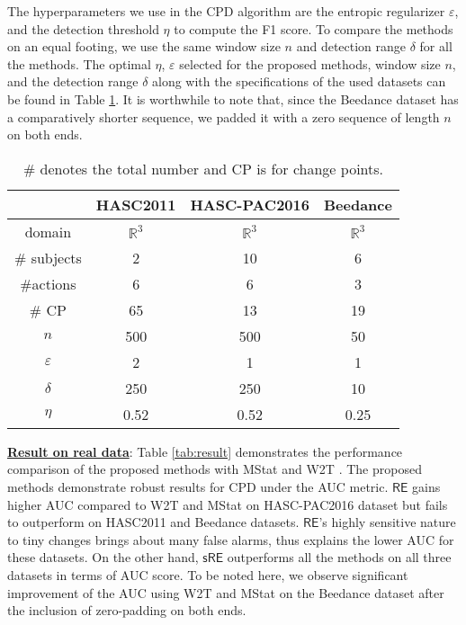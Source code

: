 \documentclass{article}
\begin{document}
The hyperparameters we use in the CPD algorithm are the entropic regularizer $\varepsilon$, and the detection threshold $\eta$ to compute the F1 score. To compare the methods on an equal footing, we use the same window size $n$ and detection range $\delta$ for all the methods. The optimal $\eta$, $\varepsilon$ selected for the proposed methods, window size $n$, and the detection range $\delta$ along with the specifications of the used datasets can be found in Table \ref{tab:real_data}. It is worthwhile to note that, since the Beedance dataset has a comparatively shorter sequence, we padded it with a zero sequence of length $n$ on both ends.
\vspace{-3mm}
\begin{table}[ht]
\centering
\setlength\tabcolsep{1.2pt}
\begin{tabular}{cccc}
                  &{\small \textbf{HASC2011}\cite{ichino2016hasc}} & {\small \textbf{HASC-PAC2016}\cite{ichino2016hasc}} & {\small \textbf{Beedance}\cite{oh2008learning}} \\\hline
{\small domain}&$\mathbb R^3$&$\mathbb R^3$&$\mathbb R^3$\\
{\small $\#$ subjects} & 2                 & 10                    & 6                 \\
{\small $\#$actions}&6                &6                      & 3                  \\
{\small$\#$ CP}          & 65                & 13                    & 19                \\
$n$               & 500               & 500                   & 50                \\
$\varepsilon$     &2                  &1                      &1\\
$\delta$          & 250               & 250                   & 10 \\
$\eta$&  0.52 & 0.52 & 0.25
\end{tabular}
\caption{{\small $\#$} denotes the total number and CP is for change points.}
\vspace{-3mm}
\label{tab:real_data}
\end{table}

\textbf{\underline{Result on real data}}: 
Table \ref{tab:result} demonstrates the performance comparison of the proposed methods with MStat \cite{li2015scan} and W2T \cite{cheng2020optimal}. The proposed methods demonstrate robust results for CPD under the AUC metric. {\small $\mathsf{RE}$} gains higher AUC compared to W2T and MStat on HASC-PAC2016 dataset but fails to outperform on HASC2011 and Beedance datasets. {\small$\mathsf{RE}$}'s highly sensitive nature to tiny changes brings about many false alarms, thus explains the lower AUC for these datasets. On the other hand, {\small$\mathsf{sRE}$} outperforms all the methods on all three datasets in terms of AUC score. To be noted here, we observe significant improvement of the AUC using W2T and MStat on the Beedance dataset after the inclusion of zero-padding on both ends.
\end{document}
